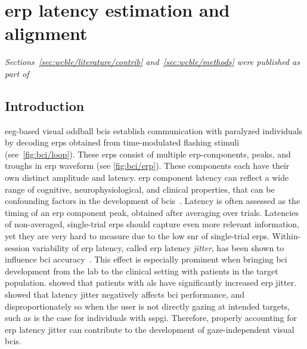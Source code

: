 
\chapter{\Acs{erp} latency estimation and alignment}
\label{sec:wcble}
\emph{Sections~\ref{sec:wcble/literature/contrib} and~\ref{sec:wcble/methods} were published
as part of~\textcite{VanDenKerchove2024}}

\section{Introduction}
\label{sec:wcble/intro}

\Ac{eeg}-based visual oddball \acp{bci} establish communication with paralyzed
individuals by decoding \acp{erp} obtained from time-modulated flashing
stimuli (see~\cref{fig:bci/loop}).
These \acp{erp} consist of multiple \ac{erp}-components, peaks, and troughs in
\ac{erp} waveform (see \cref{fig:bci/erp}).
These components each have their own distinct amplitude and latency.
\Ac{erp} component latency can reflect a wide range of cognitive,
neurophysiological, and clinical properties, that can be confounding factors in
the development of \acp{bci}~\cite{Luck2014}.
Latency is often assessed as the timing of an \ac{erp} component peak, obtained
after averaging over trials.
Latencies of non-averaged, single-trial \acp{erp} should capture even more
relevant information, yet they are very hard to measure due to the low \ac{snr} of
single-trial \acp{erp}.
Within-session variability of \ac{erp} latency, called \ac{erp} latency
\emph{jitter}, has been shown to influence \ac{bci}
accuracy~\cite{Thompson2012}.
This effect is especially prominent when bringing \ac{bci} development from the
lab to the clinical setting with patients in the target population.
\textcite{Zisk2021} showed that patients with \ac{als} have significantly
increased \ac{erp} jitter.
\textcite{Arico2014} showed that latency jitter negatively affects \ac{bci}
performance, and disproportionately so when the user is not directly gazing at
intended targets, such as is the case for individuals with \ac{sspgi}.
Therefore, properly accounting for \ac{erp} latency jitter can contribute to
the development of gaze-independent visual \acp{bci}.


